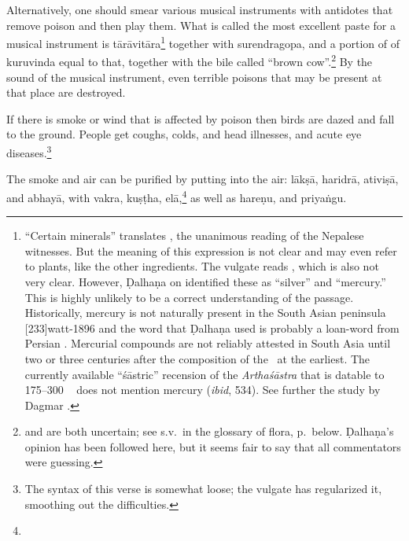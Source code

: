 \begin{translation}
Alternatively, one should smear  various musical instruments with
antidotes that remove poison and then play  them. What is called the
most  excellent paste for a musical instrument is
\gls{tārāvitāra}\footnote{“Certain  minerals” translates
    , the unanimous  reading of the Nepalese  witnesses.
    But the meaning of this expression is not  clear and may even refer to
    plants, like the other ingredients.  The vulgate  reads ,  which is also not very clear.  However, Ḍalhaṇa on
     identified  these as “silver” and “mercury.” This is
    highly unlikely  to be a correct understanding of  the passage.
    Historically, mercury is not  naturally present in the South  Asian
    peninsula [233]{watt-1896}  and the word  that
    Ḍalhaṇa used is probably a loan-word from  Persian \citep[sub
    \emph{paranda, parranda}][244b]{stei-pers}. Mercurial compounds are
    not  reliably attested in South Asia until two or three  centuries
    after the composition  of the \SS\ at the earliest.  The currently
    available  “śāstric” recension of the  \emph{Arthaśāstra} that is
    datable to 175--300 \CE\  \citep[29--31]{oliv-2013} does  not mention
    mercury (\emph{ibid}, 534). See further the study by Dagmar \citet[17,
    \emph{et passim}]{wuja-2013b}.}  together with \gls{surendragopa}, and
    a  portion of of \gls{kuruvinda} equal to that,  together with the
    bile called  “brown cow”.\footnote{  and
         are both uncertain; see s.v.\ in the glossary of flora,
        p.\,\pageref{glossary:flora} below. Ḍalhaṇa's opinion has been
        followed here, but it seems fair to say that all commentators were
        guessing.} By the sound of  the musical instrument, even terrible
        poisons that may be present at that place are destroyed.

\item [16]  

If there is smoke or wind that  is affected by poison then  birds are
dazed and fall to the ground.  People get  coughs, colds, and head 
illnesses, and acute eye diseases.\footnote{The syntax  of this verse
    is somewhat  loose; the vulgate has regularized it, smoothing  out
    the difficulties.}

\item
[17]  

The smoke and air can be  purified by putting into the  air:  \gls{lākṣā}, 
\gls{haridrā}, \gls{ativiṣā}, and \gls{abhayā}, with \gls{vakra}, \gls{kuṣṭha}, 
\gls{elā},\footnote{} as well as \gls{hareṇu}, and \gls{priyaṅgu}.  
\end{translation}  


